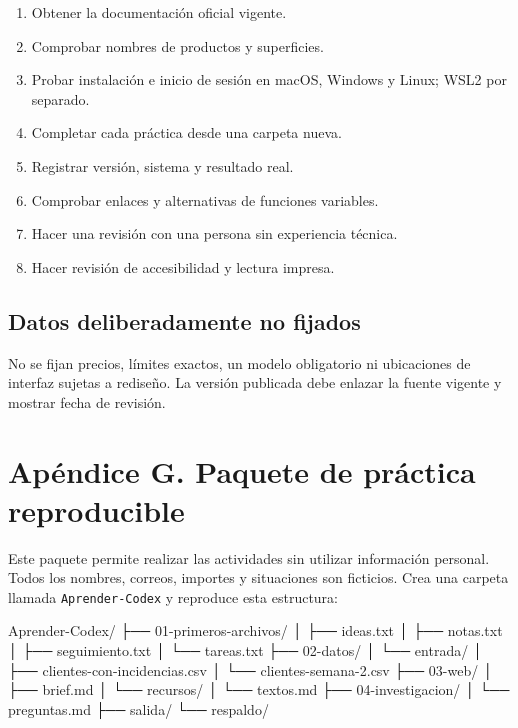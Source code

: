 \documentclass[10pt,a4paper,openany]{book}
\providecommand{\tightlist}{\setlength{\itemsep}{0.18em}\setlength{\parskip}{0pt}}
\newenvironment{Shaded}{}{}
\newcommand{\NormalTok}[1]{#1}
\renewenvironment{Shaded}
  {\begin{tcolorbox}[
    enhanced,
    breakable,
    colback=CodeBg,
    colframe=Border,
    boxrule=0.5pt,
    arc=2mm,
    left=3mm,
    right=3mm,
    top=2.2mm,
    bottom=2.2mm,
    before skip=0.8em,
    after skip=0.9em
  ]}
  {\end{tcolorbox}}
\begin{document}
\begin{enumerate}
\def\labelenumi{\arabic{enumi}.}
\tightlist
\item
  Obtener la documentación oficial vigente.
\item
  Comprobar nombres de productos y superficies.
\item
  Probar instalación e inicio de sesión en macOS, Windows y Linux; WSL2
  por separado.
\item
  Completar cada práctica desde una carpeta nueva.
\item
  Registrar versión, sistema y resultado real.
\item
  Comprobar enlaces y alternativas de funciones variables.
\item
  Hacer una revisión con una persona sin experiencia técnica.
\item
  Hacer revisión de accesibilidad y lectura impresa.
\end{enumerate}

\section{Datos deliberadamente no
fijados}\label{datos-deliberadamente-no-fijados}

No se fijan precios, límites exactos, un modelo obligatorio ni
ubicaciones de interfaz sujetas a rediseño. La versión publicada debe
enlazar la fuente vigente y mostrar fecha de revisión.

\chapter{Apéndice G. Paquete de práctica
reproducible}\label{apuxe9ndice-g.-paquete-de-pruxe1ctica-reproducible}

Este paquete permite realizar las actividades sin utilizar información
personal. Todos los nombres, correos, importes y situaciones son
ficticios. Crea una carpeta llamada \texttt{Aprender-Codex} y reproduce
esta estructura:

\begin{Shaded}
\begin{Highlighting}[]
\NormalTok{Aprender{-}Codex/}
\NormalTok{├── 01{-}primeros{-}archivos/}
\NormalTok{│   ├── ideas.txt}
\NormalTok{│   ├── notas.txt}
\NormalTok{│   ├── seguimiento.txt}
\NormalTok{│   └── tareas.txt}
\NormalTok{├── 02{-}datos/}
\NormalTok{│   └── entrada/}
\NormalTok{│       ├── clientes{-}con{-}incidencias.csv}
\NormalTok{│       └── clientes{-}semana{-}2.csv}
\NormalTok{├── 03{-}web/}
\NormalTok{│   ├── brief.md}
\NormalTok{│   └── recursos/}
\NormalTok{│       └── textos.md}
\NormalTok{├── 04{-}investigacion/}
\NormalTok{│   └── preguntas.md}
\NormalTok{├── salida/}
\NormalTok{└── respaldo/}
\end{Highlighting}
\end{Shaded}
\end{document}
